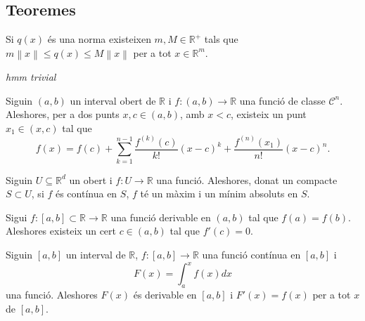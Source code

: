 \documentclass[../Apunts.tex]{subfiles}
\begin{document}
	\subsection{Teoremes}
	\begin{theorem}
		\label{thm:Equivalència de normes}
		Si \(q(x)\) és una norma existeixen \(m,M\in\mathbb{R}^{+}\) tals que \(m\left\lVert x\right\rVert\leq q(x)\leq M\left\lVert x\right\rVert\) per a tot \(x\in\mathbb{R}^{m}\).
	\end{theorem}
	\begin{theorem}
		\label{Teorema del Valor Mig}\label{thm:TVM}
		\emph{hmm trivial}
	\end{theorem}
	\begin{theorem}
		\label{thm:Desigualtat de C-S}
	\end{theorem}
	\begin{theorem}%
		\label{thm:Teorema de Taylor} %
		Siguin \((a,b)\) un interval obert de \(\mathbb{R}\) i \(f\colon(a,b)\rightarrow\mathbb{R}\) una funció de classe \(\mathcal{C}^{n}\). Aleshores, per a dos punts \(x,c\in(a,b)\), amb \(x<c\), existeix un punt \(x_{1}\in(x,c)\) tal que
		\[f(x)=f(c)+\sum_{k=1}^{n-1}\frac{f^{(k)}(c)}{k!}(x-c)^{k}+\frac{f^{(n)}(x_{1})}{n!}(x-c)^{n}.\]
	\end{theorem}
	\begin{theorem}
		\label{thm:Weierstrass màxims i mínims múltiples variables}
		Siguin \(U\subseteq\mathbb{R}^{d}\) un obert i \(f\colon U\to\mathbb{R}\) una funció. Aleshores, donat un compacte \(S\subset U\), si \(f\) és contínua en \(S\), \(f\) té un màxim i un mínim absoluts en \(S\).
	\end{theorem}
	\begin{theorem}
		\label{thm:sandvitx}
	\end{theorem}
	\begin{theorem}
		\label{thm:Teorema de Rolle}
		Sigui \(f\colon[a,b]\subset\mathbb{R}\longrightarrow\mathbb{R}\) una funció derivable en \((a,b)\) tal que \(f(a)=f(b)\). Aleshores existeix un cert \(c\in(a,b)\) tal que \(f'(c)=0\).
	\end{theorem}
	\begin{theorem}
		\label{thm:Teorema Fonamental del Càlcul}
		Siguin \([a,b]\) un interval de \(\mathbb{R}\), \(f\colon[a,b]\longrightarrow\mathbb{R}\) una funció contínua en \([a,b]\) i
		\[F(x)=\int_{a}^{x}f(x)dx\]
		una funció. Aleshores \(F(x)\) és derivable en \([a,b]\) i \(F'(x)=f(x)\) per a tot \(x\) de \([a,b]\).
	\end{theorem}
\end{document}
